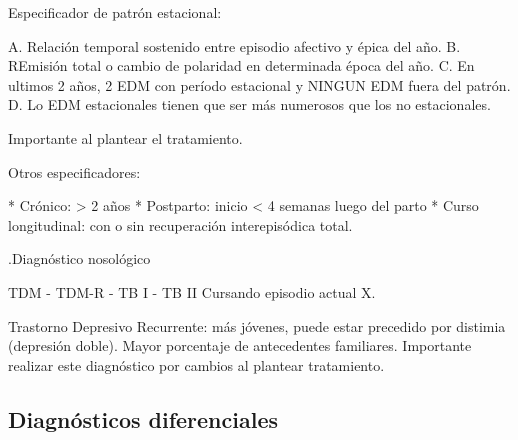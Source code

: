 Especificador de patrón estacional:

A. Relación temporal sostenido entre episodio afectivo y épica del año.
B. REmisión total o cambio de polaridad en determinada época del año.
C. En ultimos 2 años, 2 EDM con período estacional y NINGUN EDM fuera del patrón.
D. Lo EDM estacionales tienen que ser más numerosos que los no estacionales.

Importante al plantear el tratamiento.

Otros especificadores:

* Crónico: > 2 años
* Postparto: inicio < 4 semanas luego del parto
* Curso longitudinal: con o sin recuperación interepisódica total.

.Diagnóstico nosológico

TDM - TDM-R - TB I - TB II
Cursando episodio actual X.

Trastorno Depresivo Recurrente: más jóvenes, puede estar precedido por distimia (depresión doble). Mayor porcentaje de antecedentes familiares. Importante realizar este diagnóstico por cambios al plantear tratamiento.

\subsection*{Diagnósticos diferenciales}
